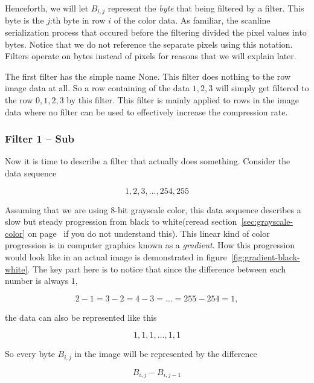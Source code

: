 Henceforth, we will let $B_{i,j}$ represent the \textit{byte} that
being filtered by a filter. This byte is the $j$:th byte in row $i$ of
the color data. As familiar, the scanline serialization process that
occured before the filtering divided the pixel values into
bytes. Notice that we do not reference the separate pixels using this
notation. Filters operate on bytes instead of pixels for reasons that
we will explain later.

The first filter has the simple name None. This filter does nothing to
the row image data at all. So a row containing of the data $1,2,3$
will simply get filtered to the row $0,1,2,3$ by this filter. This
filter is mainly applied to rows in the image data where no filter can
be used to effectively increase the compression rate.

\subsubsection{Filter 1 -- Sub}

Now it is time to describe a filter that actually does
something. Consider the data sequence

\begin{equation}
  \label{eq:1-seq}
  1,2,3,\dots,254,255
\end{equation}

Assuming that we are using 8-bit grayscale color, this data sequence
describes a slow but steady progression from black to white(reread
section~\ref{sec:grayscale-color} on
page~\pageref{sec:grayscale-color} if you do not understand
this). This linear kind of color progression is in computer graphics
known as a \textit{gradient}\cite{sayood2003lossless}. How this
progression would look like in an actual image is demonstrated in
figure~\ref{fig:gradient-black-white}. The key part here is to notice
that since the difference between each number is always $1$,

\begin{equation*}
  2-1=3-2=4-3=\dots=255-254=1,
\end{equation*}

the data can also be represented
like this

\begin{equation}
  \label{eq:filter1-seq}
  1,1,1,\dots,1,1
\end{equation}

So every byte $B_{i,j}$ in the image will be represented by the
difference

\begin{equation*}
 B_{i,j} - B_{i,j-1}
\end{equation*}

